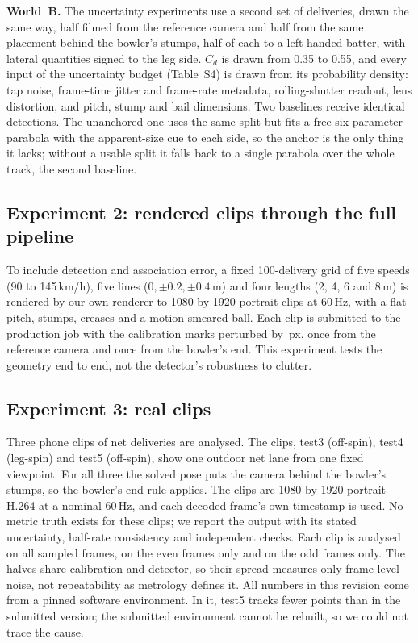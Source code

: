 \documentclass[journal]{IEEEtran}
\begin{document}
\textbf{World~B.} The uncertainty experiments use a second set of \CovBN{} deliveries, drawn the same way,
half filmed from the reference camera and half from the same placement behind the bowler's stumps, half
of each to a left-handed batter, with lateral quantities signed to the leg side. $C_d$ is drawn from 0.35
to 0.55, and every input of
the uncertainty budget (Table~S4) is drawn from its probability density: tap noise, frame-time jitter and frame-rate
metadata, rolling-shutter readout, lens distortion, and pitch, stump and bail dimensions.
Two baselines receive identical detections. The unanchored one uses the same split but fits a free
six-parameter parabola with the apparent-size cue to each side, so the anchor is the only thing it lacks;
without a usable split it falls back to a single parabola over the whole track, the second baseline.

\subsection{Experiment 2: rendered clips through the full pipeline}

To include detection and association error, a fixed 100-delivery grid of five speeds (90 to 145\,km/h),
five lines ($0, \pm 0.2, \pm 0.4$\,m) and four lengths (2, 4, 6 and 8\,m) is rendered by our own renderer to 1080 by 1920 portrait
clips at 60\,Hz, with a flat pitch, stumps, creases and a motion-smeared ball. Each clip is submitted to the
production job with the calibration marks perturbed by \EteTapPx\,px, once from the reference camera and once from the bowler's end. This experiment tests
the geometry end to end, not the detector's robustness to clutter.

\subsection{Experiment 3: real clips}

Three phone clips of net deliveries are analysed. The clips, test3 (off-spin), test4 (leg-spin) and test5 (off-spin),
show one outdoor net lane from one fixed viewpoint.
For all three the solved pose puts the camera behind the bowler's stumps, so the bowler's-end rule applies.
The clips are 1080 by 1920 portrait H.264 at a nominal 60\,Hz, and each decoded frame's own timestamp is
used. No metric truth exists for these clips; we report the output with its stated uncertainty, half-rate
consistency and independent checks. Each clip is analysed on all sampled frames, on the even frames only
and on the odd frames only. The halves share calibration and detector, so their spread measures
only frame-level noise, not repeatability as metrology defines it.
All numbers in this revision come from a pinned software environment. In it, test5 tracks fewer points than in
the submitted version; the submitted environment cannot be rebuilt, so we could not trace the cause.
\end{document}
